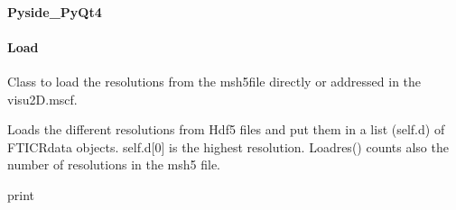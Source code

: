 \documentclass[letterpaper,10pt,openany,oneside]{sphinxmanual}
\begin{document}
\paragraph{Pyside\_PyQt4}
\label{rst/visu2d:pyside-pyqt4}\label{rst/visu2d:module-Visu.Pyside_PyQt4}

\paragraph{Load}
\label{rst/visu2d:load}\label{rst/visu2d:module-Visu.Load}

\begin{fulllineitems}
\label{rst/visu2d:Visu.Load.LOAD}
Class to load the resolutions from the msh5file directly or addressed in the visu2D.mscf.

\begin{fulllineitems}
\label{rst/visu2d:Visu.Load.LOAD.loadres}
Loads the different resolutions from Hdf5 files and put them in a list (self.d) of FTICRdata objects. 
self.d{[}0{]} is the highest resolution. Loadres() counts also the number of resolutions in the msh5 file.

\end{fulllineitems}


\begin{fulllineitems}
\label{rst/visu2d:Visu.Load.LOAD.pr}
print

\end{fulllineitems}


\end{fulllineitems}

\end{document}
